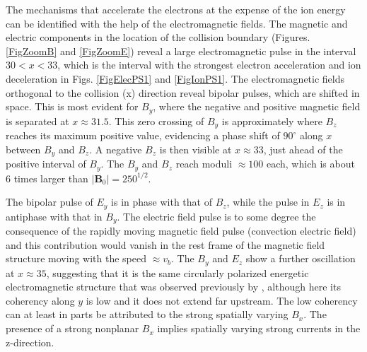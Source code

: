 \documentclass[structabstract]{aa}
\begin{document}
The mechanisms that accelerate the electrons at the expense of the ion 
energy can be identified with the help of the electromagnetic fields. The 
magnetic and electric components in the location of the collision boundary 
(Figures. \ref{FigZoomB} and \ref{FigZoomE}) reveal a large electromagnetic 
pulse in the interval $30<x<33$, which is the interval with the strongest 
electron acceleration and ion deceleration in Figs. \ref{FigElecPS1} 
and \ref{FigIonPS1}. The electromagnetic fields orthogonal to the collision 
(x) direction reveal bipolar pulses, which are shifted in space. This is 
most evident for $B_y$, where the negative and positive magnetic field is 
separated at $x\approx 31.5$. This zero crossing of $B_y$ is approximately 
where $B_z$ reaches its maximum positive value, evidencing a phase shift
of $90^\circ$ along $x$ between $B_y$ and $B_z$. A negative $B_z$ is then 
visible at $x\approx 33$, just ahead of the positive interval of $B_y$. 
The $B_y$ and $B_z$ reach moduli $\approx 100$ each, which is about 6 times 
larger than $|\mathbf{B}_0| = 250^{1/2}$. 

The bipolar pulse of $E_y$ is in 
phase with that of $B_z$, while the pulse in $E_z$ is in antiphase with 
that in $B_y$. The electric field pulse is to some degree the consequence 
of the rapidly moving magnetic field pulse (convection electric field) and 
this contribution would vanish in the rest frame of the magnetic field 
structure moving with the speed $\approx v_b$. The $B_y$ and $E_z$ show a 
further oscillation at $x\approx 35$, suggesting that it is the same 
circularly polarized energetic electromagnetic structure that was observed 
previously by \citet{Dieckmann:2008dp,Dieckmann:2010qf}, although here its 
coherency along $y$ is low and it does not extend far upstream. The low 
coherency can at least in parts be attributed to the strong spatially 
varying $B_x$. The presence of a strong nonplanar $B_x$ implies spatially
varying strong currents in the z-direction.
\end{document}
